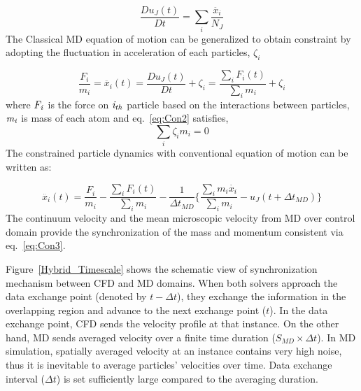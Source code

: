 \documentclass{CFD2010paper}
\begin{document}
\vspace{-.2em}
\begin{equation}
 \frac{Du_{J}(t)}{Dt} =  \displaystyle\sum_{i} \frac{\ddot{x_{i}}}{N_{J}}
 \label{eq:Lagrangian}
\end{equation}
\normalsize
The Classical MD equation of motion can be generalized to obtain constraint by adopting the fluctuation in acceleration of each particles, $\zeta_{i}$

\vspace{-.2em}
\begin{equation}
 \frac{F_{i}}{m_{i}} = \ddot{x_{i}}(t)  =   \frac{Du_{J}(t)}{Dt} + \zeta_{i} = \frac{\displaystyle\sum_{i}F_{i}(t)} {\displaystyle\sum_{i}m_{i}} +   \zeta_{i}
 \label{eq:Con2}
\end{equation}
\normalsize
where $\it F_{i}$ is the force on $\it i_{th}$ particle based on the interactions between particles,  $\it m_{i}$ is mass of each atom and  eq.~\ref{eq:Con2} satisfies,
\vspace{-.2em}
\begin{equation}
\displaystyle\sum_{i}\zeta_{i}m_{i} = 0
 \label{eq:Con2}
\end{equation}
\normalsize
The constrained particle dynamics with conventional equation of motion can be written as:

\vspace{-.2em}
\begin{equation}
 \ddot{x_{i}}(t) = \frac{F_{i}}{m_{i}} -  \frac{\displaystyle\sum_{i}F_{i}(t)} {\displaystyle\sum_{i}m_{i}} - \frac{1}{\Delta t_{MD}} \{  \frac{\displaystyle\sum_{i}m_{i}\dot{x_{i}}} {\displaystyle\sum_{i}m_{i}} - u_{J}(t + \Delta t_{MD})\}
 \label{eq:Con3}
\end{equation}
\normalsize
The continuum velocity and the mean microscopic velocity from MD over control domain provide the synchronization of the mass and momentum consistent via eq.~\ref{eq:Con3}.



Figure~\ref{Hybrid_Timescale} shows the schematic view of synchronization mechanism between CFD and MD domains. When both solvers approach the data exchange point (denoted by $t-{\Delta}t$), they exchange the information in the overlapping region and advance to the next exchange point ($t$). In the data exchange point, CFD sends the velocity profile at that instance. On the other hand, MD sends averaged velocity over a finite time duration ($S_{MD}{\times}{\Delta}t$). In MD simulation, spatially averaged velocity at an instance contains very high noise, thus it is inevitable to average particles' velocities over time. Data exchange interval (${\Delta}t$) is set sufficiently large compared to the averaging duration.
\end{document}
